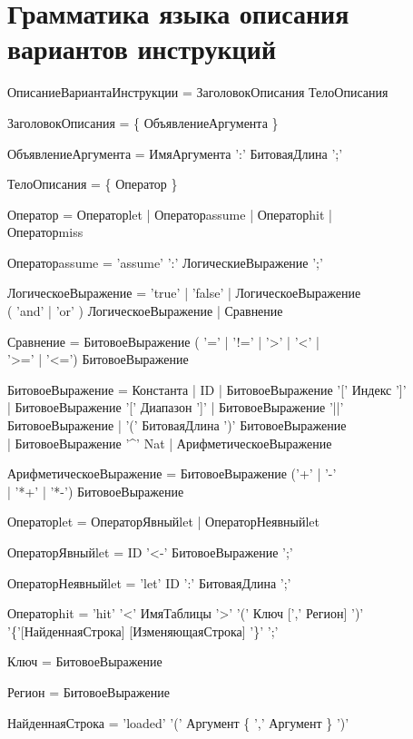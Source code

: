 \chapter{Грамматика языка описания вариантов инструкций}\label{sec:syntax}

{\tt

ОписаниеВариантаИнструкции = ЗаголовокОписания ТелоОписания

ЗаголовокОписания = \{ ОбъявлениеАргумента \}

ОбъявлениеАргумента = ИмяАргумента ':' БитоваяДлина ';'

ТелоОписания = \{ Оператор \}

Оператор = Операторlet | Операторassume | Операторhit | \\Операторmiss

Операторassume = 'assume' ':' ЛогическиеВыражение ';'

ЛогическоеВыражение = 'true' | 'false' | ЛогическоеВыражение\\ ( 'and' | 'or' ) ЛогическоеВыражение | Сравнение

Сравнение = БитовоеВыражение ( '=' | '!=' | '>' | '<' | \\ '>='  | '<=') БитовоеВыражение

БитовоеВыражение = Константа | ID | БитовоеВыражение '[' Индекс ']'\\ | БитовоеВыражение '[' Диапазон ']' | БитовоеВыражение '||' \\ БитовоеВыражение | '(' БитоваяДлина ')' БитовоеВыражение \\ | БитовоеВыражение '\^{ }' Nat | АрифметическоеВыражение

АрифметическоеВыражение = БитовоеВыражение ('+' | '-' \\ | '*+' | '*-') БитовоеВыражение

Операторlet = ОператорЯвныйlet | ОператорНеявныйlet

ОператорЯвныйlet = ID '<-' БитовоеВыражение ';'

ОператорНеявныйlet = 'let' ID ':' БитоваяДлина ';'

Операторhit = 'hit' '<' ИмяТаблицы '>' '(' Ключ [',' Регион] ')'\\ '\{'[НайденнаяСтрока] [ИзменяющаяСтрока] '\}' ';'

Ключ = БитовоеВыражение

Регион = БитовоеВыражение

НайденнаяСтрока = 'loaded' '('  Аргумент \{ ',' Аргумент \} ')'

}
